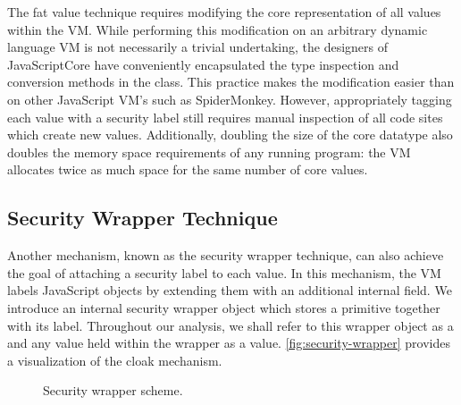 The fat value technique requires modifying the core representation of all values within the VM.
While performing this modification on an arbitrary dynamic language VM is not necessarily a trivial undertaking, the designers of JavaScriptCore have conveniently encapsulated the type inspection and conversion methods in the  class.
This practice makes the modification easier than on other JavaScript VM's such as SpiderMonkey.
However, appropriately tagging each value with a security label still requires manual inspection of all code sites which create new values.
Additionally, doubling the size of the core datatype also doubles the memory space requirements of any running program: the VM allocates twice as much space for the same number of core values.

\subsection{Security Wrapper Technique}\label{sec:cloaks}

Another mechanism, known as the security wrapper technique, can also achieve the goal of attaching a security label to each value.
In this mechanism, the VM labels JavaScript objects by extending them with an additional internal field.
We introduce an internal security wrapper object which stores a primitive together with its label.
Throughout our analysis, we shall refer to this wrapper object as a  and any value held within the wrapper as a  value.
\autoref{fig:security-wrapper} provides a visualization of the cloak mechanism.

\begin{figure}[h]
 \centering
{}
\caption{Security wrapper scheme.}
\label{fig:security-wrapper}
\end{figure}

